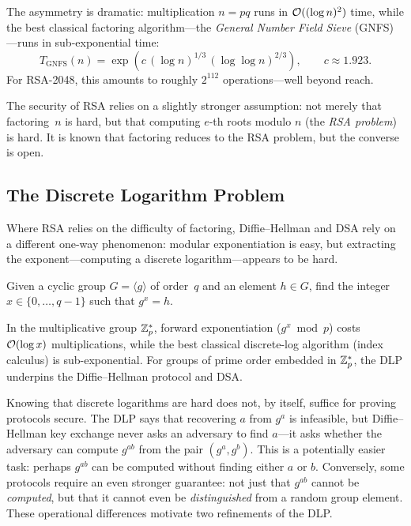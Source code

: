 The asymmetry is dramatic: multiplication $n = pq$ runs in $\mathcal{O}((\log n)^2)$ time, while the best classical factoring algorithm---the \emph{General Number Field Sieve} (GNFS)---runs in sub-exponential time:
\begin{equation}
\label{eq:gnfs}
T_{\mathrm{GNFS}}(n) = \exp\!\left(c\,(\log n)^{1/3}\,(\log\log n)^{2/3}\right), \qquad c \approx 1.923.
\end{equation}
For RSA-2048, this amounts to roughly $2^{112}$ operations---well beyond reach.

The security of RSA relies on a slightly stronger assumption: not merely that factoring~$n$ is hard, but that computing $e$-th roots modulo $n$ (the \emph{RSA problem}) is hard.  It is known that factoring reduces to the RSA problem, but the converse is open.

\subsection{The Discrete Logarithm Problem}
\label{subsec:dlp}

Where RSA relies on the difficulty of factoring, Diffie--Hellman and DSA rely on a different one-way phenomenon: modular exponentiation is easy, but extracting the exponent---computing a discrete logarithm---appears to be hard.

\begin{definition}
\label{def:dlp}
Given a cyclic group $G = \langle g \rangle$ of order~$q$ and an element $h \in G$, find the integer $x \in \{0, \ldots, q-1\}$ such that $g^x = h$.
\end{definition}

In the multiplicative group $\mathbb{Z}_p^*$, forward exponentiation ($g^x \bmod p$) costs $\mathcal{O}(\log x)$ multiplications, while the best classical discrete-log algorithm (index calculus) is sub-exponential.  For groups of prime order embedded in $\mathbb{Z}_p^*$, the DLP underpins the Diffie--Hellman protocol and DSA.

Knowing that discrete logarithms are hard does not, by itself, suffice for proving protocols secure.  The DLP says that recovering $a$ from $g^a$ is infeasible, but Diffie--Hellman key exchange never asks an adversary to find $a$---it asks whether the adversary can compute $g^{ab}$ from the pair $(g^a, g^b)$.  This is a potentially easier task: perhaps $g^{ab}$ can be computed without finding either $a$ or $b$.  Conversely, some protocols require an even stronger guarantee: not just that $g^{ab}$ cannot be \emph{computed}, but that it cannot even be \emph{distinguished} from a random group element.  These operational differences motivate two refinements of the DLP.


